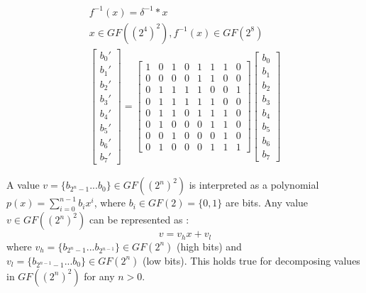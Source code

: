 \begin{equation}
\begin{gathered}
\label{eq:iso_map_rev}
f^{-1}(x) = \delta^{-1} * x\\
x \in GF((2^4)^2), f^{-1}(x) \in GF(2^8) \\
\begin{bmatrix}
b_0'\\b_1'\\b_2'\\b_3'\\b_4'\\b_5'\\b_6'\\b_7'
\end{bmatrix}
=
\begin{bmatrix}
    1 & 0 & 1 & 0 & 1 & 1 & 1 & 0 \\
    0 & 0 & 0 & 0 & 1 & 1 & 0 & 0 \\
    0 & 1 & 1 & 1 & 1 & 0 & 0 & 1 \\
    0 & 1 & 1 & 1 & 1 & 1 & 0 & 0 \\
    0 & 1 & 1 & 0 & 1 & 1 & 1 & 0 \\
    0 & 1 & 0 & 0 & 0 & 1 & 1 & 0 \\
    0 & 0 & 1 & 0 & 0 & 0 & 1 & 0 \\
    0 & 1 & 0 & 0 & 0 & 1 & 1 & 1
\end{bmatrix}
\begin{bmatrix}
b_0\\b_1\\b_2\\b_3\\b_4\\b_5\\b_6\\b_7
\end{bmatrix}
\end{gathered}
\end{equation}

A value $v = \{b_{2^n-1}...b_0\} \in GF((2^n)^2)$ is interpreted as a polynomial $p(x) = \sum_{i=0}^{n-1} b_ix^i$, where $b_i \in GF(2) = \{0, 1\}$ are bits. Any value $v \in GF((2^n)^2)$ can be represented as \cite{vlsi}:
\begin{equation}
\label{eq:poly_repr}
v = v_hx + v_l
\end{equation}
where $v_h = \{b_{2^n-1}...b_{2^{n-1}}\} \in GF(2^n)$ (high bits) and $v_l = \{b_{2^{n-1}-1}...b_0\} \in GF(2^n)$ (low bits). This holds true for decomposing values in $GF((2^n)^2)$ for any $n > 0$.




